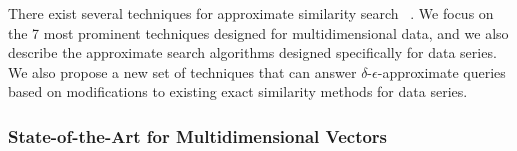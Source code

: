 There exist several techniques for approximate similarity search~\cite{conf/stoc/indyk1998,conf/vldb/Gionis1999, journal/jda/bustos2004,conf/icde/houle2005,conf/kdd/ColeSZ05,journal/tpami/chavez2008,conf/icsis/amato2008,conf/sisap/tellez2011,conf/vldb/sun14,journal/tpami/ge2014,journal/corr/malkov16,conf/cvpr/yandex16}  {\color{black}\cite{conf/sigmod/berchtold1998,conf/pods/ooi2000,conf/vldb/yu2001}}. 
We focus on the {\color{black}7} most prominent techniques designed for multidimensional data, and we also describe the approximate search algorithms designed specifically for data series. 
We also propose a new set of techniques that can answer $\delta$-$\epsilon$-approximate queries based on modifications to existing exact similarity methods for data series.


















\subsubsection{State-of-the-Art for Multidimensional Vectors}

